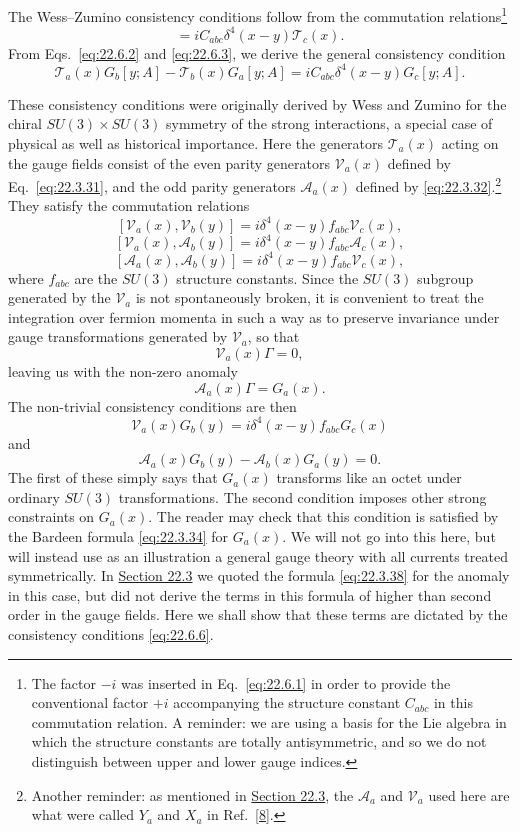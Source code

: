 The Wess--Zumino consistency conditions follow from the commutation
relations\footnote{The factor $-i$ was inserted in
Eq.~\eqref{eq:22.6.1} in order to provide the conventional factor $+i$
accompanying the structure constant $C_{abc}$ in this
commutation relation. A reminder: we are using a basis for the Lie algebra
in which the structure constants are totally antisymmetric, and so we do
not distinguish between upper and lower gauge indices.}
\begin{equation}
 [\mathcal T_a(x),\mathcal T_b(y)]
 =iC_{abc}\delta^4(x-y)\mathcal T_c(x).
 \tag{22.6.5}\label{eq:22.6.5}
\end{equation}
From Eqs.~\eqref{eq:22.6.2} and \eqref{eq:22.6.3}, we derive the general
consistency condition
\begin{equation}
 \mathcal T_a(x)G_b[y;A]
 -\mathcal T_b(x)G_a[y;A]
 =iC_{abc}\delta^4(x-y)G_c[y;A].
 \tag{22.6.6}\label{eq:22.6.6}
\end{equation}

These consistency conditions were originally derived by Wess and Zumino
for the chiral $SU(3)\times SU(3)$ symmetry of the strong interactions, a
special case of physical as well as historical importance. Here the
generators $\mathcal T_a(x)$ acting on the gauge fields consist of the
even parity generators $\mathcal V_a(x)$ defined by
Eq.~\eqref{eq:22.3.31}, and the odd parity generators $\mathcal A_a(x)$
defined by \eqref{eq:22.3.32}.\footnote{Another reminder: as mentioned in
\hyperref[sec:22.3]{Section 22.3}, the $\mathcal A_a$ and $\mathcal V_a$
used here are what were called $Y_a$ and $X_a$ in
Ref.~\hyperref[ch22-ref-8]{[8]}.} They satisfy the commutation relations
\[
 [\mathcal V_a(x),\mathcal V_b(y)]
 =i\delta^4(x-y)f_{abc}\mathcal V_c(x),
\]
\[
 [\mathcal V_a(x),\mathcal A_b(y)]
 =i\delta^4(x-y)f_{abc}\mathcal A_c(x),
\]
\[
 [\mathcal A_a(x),\mathcal A_b(y)]
 =i\delta^4(x-y)f_{abc}\mathcal V_c(x),
\]
where $f_{abc}$ are the $SU(3)$ structure constants. Since the $SU(3)$
subgroup generated by the $\mathcal V_a$ is not spontaneously broken, it
is convenient to treat the integration over fermion momenta in such a way
as to preserve invariance under gauge transformations generated by
$\mathcal V_a$, so that
\[
 \mathcal V_a(x)\Gamma=0,
\]
leaving us with the non-zero anomaly
\[
 \mathcal A_a(x)\Gamma=G_a(x).
\]
The non-trivial consistency conditions are then
\[
 \mathcal V_a(x)G_b(y)
 =i\delta^4(x-y)f_{abc}G_c(x)
\]
and
\[
 \mathcal A_a(x)G_b(y)-\mathcal A_b(x)G_a(y)=0.
\]
The first of these simply says that $G_a(x)$ transforms like an octet
under ordinary $SU(3)$ transformations. The second condition imposes
other strong constraints on $G_a(x)$. The reader may check that this
condition is satisfied by the Bardeen formula \eqref{eq:22.3.34} for
$G_a(x)$. We will not go into this here, but will instead use as an
illustration a general gauge theory with all currents treated symmetrically.
In \hyperref[sec:22.3]{Section 22.3} we quoted the formula
\eqref{eq:22.3.38} for the anomaly in this case, but did not derive the
terms in this formula of higher than second order in the gauge fields. Here
we shall show that these terms are dictated by the consistency conditions
\eqref{eq:22.6.6}.

